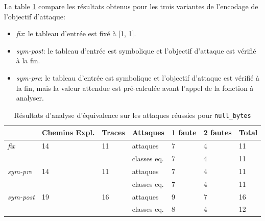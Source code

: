                 La table \ref{tbl:eq-results-prepost} compare les résultats obtenus pour les trois variantes de l'encodage de l'objectif d'attaque:
                \begin{itemize}
                    \item \textit{fix}: le tableau d'entrée est fixé à [1, 1].
                    \item \textit{sym-post}: le tableau d'entrée est symbolique et l'objectif d'attaque est vérifié à la fin.
                    \item \textit{sym-pre}: le tableau d'entrée est symbolique et l'objectif d'attaque est vérifié à la fin, mais la valeur attendue est pré-calculée avant l'appel de la fonction à analyser.
                \end{itemize}

                \begin{table}[h]
                    \caption{Résultats d'analyse d'équivalence sur les attaques réussies pour \texttt{null\_bytes}}
                    \label{tbl:eq-results-prepost}
                    \small
                    \begin{center}
                        \begin{tabular}{l|llllll}
                                 & Chemins Expl. & Traces & Attaques    & 1 faute & 2 fautes & Total \\
                                 \hline
                        \textit{fix}      & 14 & 11  & attaques    & 7       & 4        & 11    \\
                                 &    &     & classes eq. & 7       & 4        & 11    \\
                        \textit{sym-pre}  & 14 & 11  & attaques    & 7       & 4        & 11    \\
                                 &    &     & classes eq. & 7       & 4        & 11    \\
                        \textit{sym-post} & 19 & 16  & attaques    & 9       & 7        & 16    \\
                                 &    &     & classes eq. & 8       & 4        & 12  
                        \end{tabular}
                    \end{center}
                \end{table} 
            

